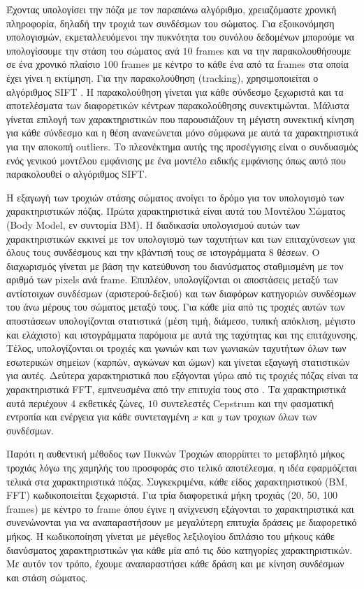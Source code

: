 \documentclass[11pt,a4paper,english,greek,twoside]{../Thesis}
\begin{document}
\par Έχοντας υπολογίσει την πόζα με τον παραπάνω αλγόριθμο, χρειαζόμαστε χρονική πληροφορία, δηλαδή την τροχιά των συνδέσμων του σώματος. Για εξοικονόμηση υπολογισμών, εκμεταλλευόμενοι την πυκνότητα του συνόλου δεδομένων μπορούμε να υπολογίσουμε την στάση του σώματος ανά $10$ frames και να την παρακολουθήσουμε σε ένα χρονικό πλαίσιο $100$ frames με κέντρο το κάθε ένα από τα frames στα οποία έχει γίνει η εκτίμηση. Για την παρακολούθηση (tracking), χρησιμοποιείται ο αλγόριθμος SIFT \cite{lowe_1999}. Η παρακολούθηση γίνεται για κάθε σύνδεσμο ξεχωριστά και τα αποτελέσματα των διαφορετικών κέντρων παρακολούθησης συνεκτιμώνται. Μάλιστα γίνεται επιλογή των χαρακτηριστικών που παρουσιάζουν τη μέγιστη συνεκτική κίνηση για κάθε σύνδεσμο και η θέση ανανεώνεται μόνο σύμφωνα με αυτά τα χαρακτηριστικά για την αποκοπή outliers. Το πλεονέκτημα αυτής της προσέγγισης είναι ο συνδυασμός ενός γενικού μοντέλου εμφάνισης με ένα μοντέλο ειδικής εμφάνισης όπως αυτό που παρακολουθεί ο αλγόριθμος SIFT.

\par Η εξαγωγή των τροχιών στάσης σώματος ανοίγει το δρόμο για τον υπολογισμό των χαρακτηριστικών πόζας. Πρώτα χαρακτηριστικά είναι αυτά του Μοντέλου Σώματος (Body Model, εν συντομία BM). Η διαδικασία υπολογισμού αυτών των χαρακτηριστικών εκκινεί με τον υπολογισμό των ταχυτήτων και των επιταχύνσεων για όλους τους συνδέσμους και την κβάντισή τους σε ιστογράμματα $8$ θέσεων. Ο διαχωρισμός γίνεται με βάση την κατεύθυνση του διανύσματος σταθμισμένη με τον αριθμό των pixels ανά frame. Επιπλέον, υπολογίζονται οι αποστάσεις μεταξύ των αντίστοιχων συνδέσμων (αριστερού-δεξιού) και των διαφόρων κατηγοριών συνδέσμων του άνω μέρους του σώματος μεταξύ τους. Για κάθε μία από τις τροχιές αυτών των αποστάσεων υπολογίζονται στατιστικά (μέση τιμή, διάμεσο, τυπική απόκλιση, μέγιστο και ελάχιστο) και ιστογράμματα παρόμοια με αυτά της ταχύτητας και της επιτάχυνσης. Τέλος, υπολογίζονται οι τροχιές και γωνιών και των γωνιακών ταχυτήτων όλων των εσωτερικών σημείων (καρπών, αγκώνων και ώμων) και γίνεται εξαγωγή στατιστικών για αυτές. Δεύτερα χαρακτηριστικά που εξάγονται γύρω από τις τροχιές πόζας είναι τα χαρακτηριστικά FFT, εμπνευσμένα από την επιτυχία τους στο \cite{zinnen_2009}. Τα χαρακτηριστικά αυτά περιέχουν $4$ εκθετικές ζώνες, $10$ συντελεστές Cepstrum και την φασματική εντροπία και ενέργεια για κάθε συντεταγμένη $x$ και $y$ των τροχιων όλων των συνδέσμων.

\par Παρότι η αυθεντική μέθοδος των Πυκνών Τροχιών απορρίπτει το μεταβλητό μήκος τροχιάς λόγω της χαμηλής του προσφοράς στο τελικό αποτέλεσμα, η ιδέα εφαρμόζεται τελικά στα χαρακτηριστικά πόζας. Συγκεκριμένα, κάθε είδος χαρακτηριστικού (BM, FFT) κωδικοποιείται ξεχωριστά. Για τρία διαφορετικά μήκη τροχιάς (20, 50, 100 frames) με κέντρο το frame όπου έγινε η ανίχνευση εξάγονται το χαρακτηριστικά και συνενώνονται για να αναπαραστήσουν με μεγαλύτερη επιτυχία δράσεις με διαφορετικό μήκος. Η κωδικοποίηση γίνεται με μέγεθος λεξιλογίου διπλάσιο του μήκους κάθε διανύσματος χαρακτηριστικών για κάθε μία από τις δύο κατηγορίες χαρακτηριστικών. Με αυτόν τον τρόπο, έχουμε αναπαραστήσει κάθε δράση και με κίνηση συνδέσμων και στάση σώματος.
\end{document}

